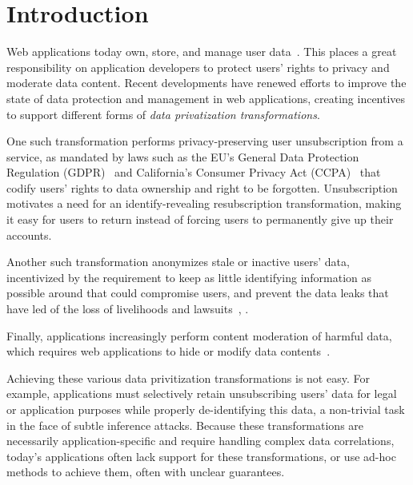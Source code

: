 \section{Introduction}
Web applications today own, store, and manage user data~\cite{nytimes:fb, npr:data}. 
This places a great responsibility on application developers to protect users' rights to privacy and
moderate data content.
%
Recent developments have renewed efforts to improve the state of data protection and management in
web applications, creating incentives to support different forms of \emph{data privatization 
transformations}. 

One such transformation performs privacy-preserving user unsubscription from a service, as mandated
by laws such as the EU's General Data Protection Regulation (GDPR)~\cite{eu:gdpr} and California's
Consumer Privacy Act (CCPA)~\cite{ca:privacy-act} that codify users' rights to data ownership and
right to be forgotten.  Unsubscription motivates a need for an identify-revealing resubscription
transformation, making it easy for users to return instead of forcing users to permanently give up
their accounts.

Another such transformation anonymizes stale or inactive users' data, 
incentivized by the requirement to keep as little identifying information as possible
around that could compromise users, and prevent the data leaks that have led of the loss of livelihoods and
lawsuits~\cite{breach:amazon,breach:twitter, breach:fb, breach:marriott, breach:quora}, .

Finally, applications increasingly perform content moderation of harmful data, which requires web
applications to hide or modify data contents~\cite{contentmod, sasb}.

Achieving these various data privitization transformations is not easy.  For example, applications must
selectively retain unsubscribing users' data for legal or application purposes while properly
de-identifying this data, a non-trivial task in the face of subtle inference attacks.  Because these
transformations are necessarily application-specific and require handling complex data correlations,
today's applications often lack support for these transformations, or use ad-hoc methods to achieve
them, often with unclear guarantees.

